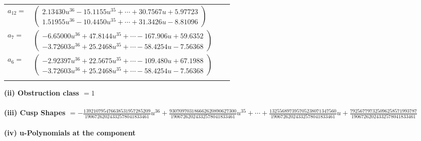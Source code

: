 \documentclass[1p]{elsarticle_modified}
\theoremstyle{definition}
\begin{document}
\begin{tabular}{m{7pt} m{180pt} m{7pt} m{180pt} }
\flushright $a_{12}=$&$\begin{pmatrix}2.13430 u^{36}-15.1155 u^{35}+\cdots+30.7567 u+5.97723\\1.51955 u^{36}-10.4450 u^{35}+\cdots+31.3426 u-8.81096\end{pmatrix}$ \\
\flushright $a_{7}=$&$\begin{pmatrix}-6.65000 u^{36}+47.8144 u^{35}+\cdots-167.906 u+59.6352\\-3.72603 u^{36}+25.2468 u^{35}+\cdots-58.4254 u-7.56368\end{pmatrix}$ \\
\flushright $a_{6}=$&$\begin{pmatrix}-2.92397 u^{36}+22.5675 u^{35}+\cdots-109.480 u+67.1988\\-3.72603 u^{36}+25.2468 u^{35}+\cdots-58.4254 u-7.56368\end{pmatrix}$\\&\end{tabular}
\flushleft \textbf{(ii) Obstruction class $= 1$}\\~\\
\flushleft \textbf{(iii) Cusp Shapes $= -\frac{139210795476638531957285209}{19067262024332578041833461} u^{36}+\frac{930709703186662620890627300}{19067262024332578041833461} u^{35}+\cdots+\frac{132556897395705238071347560}{19067262024332578041833461} u+\frac{792567797325096258571993787}{19067262024332578041833461}$}\\~\\
\newpage\renewcommand{\arraystretch}{1}
\flushleft \textbf{(iv) u-Polynomials at the component}\newline \\
\end{document}
